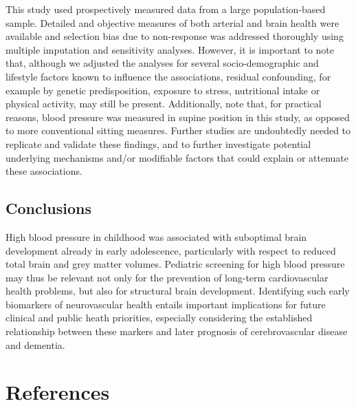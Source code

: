 \documentclass[
  letterpaper,
  DIV=11,
  numbers=noendperiod]{scrreport}
\begin{document}
This study used prospectively measured data from a large
population-based sample. Detailed and objective measures of both
arterial and brain health were available and selection bias due to
non-response was addressed thoroughly using multiple imputation and
sensitivity analyses. However, it is important to note that, although we
adjusted the analyses for several socio-demographic and lifestyle
factors known to influence the associations, residual confounding, for
example by genetic predisposition, exposure to stress, nutritional
intake or physical activity, may still be present. Additionally, note
that, for practical reasons, blood pressure was measured in supine
position in this study, as opposed to more conventional sitting
measures. Further studies are undoubtedly needed to replicate and
validate these findings, and to further investigate potential underlying
mechanisms and/or modifiable factors that could explain or attenuate
these associations.

\subsection{Conclusions}\label{conclusions-2}

High blood pressure in childhood was associated with suboptimal brain
development already in early adolescence, particularly with respect to
reduced total brain and grey matter volumes. Pediatric screening for
high blood pressure may thus be relevant not only for the prevention of
long-term cardiovascular health problems, but also for structural brain
development. Identifying such early biomarkers of neurovascular health
entails important implications for future clinical and public heath
priorities, especially considering the established relationship between
these markers and later prognosis of cerebrovascular disease and
dementia.

\section*{References}\label{references-6}

\end{document}
